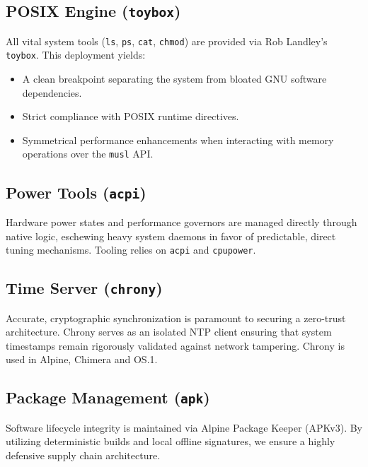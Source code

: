 \documentclass{article}
\begin{document}
\subsection{POSIX Engine (\texttt{toybox})}
All vital system tools (\texttt{ls}, \texttt{ps}, \texttt{cat}, \texttt{chmod}) are provided via Rob Landley’s \texttt{toybox}. This deployment yields:
\begin{itemize}
    \item A clean breakpoint separating the system from bloated GNU software dependencies.
    \item Strict compliance with POSIX runtime directives.
    \item Symmetrical performance enhancements when interacting with memory operations over the \texttt{musl} API.
\end{itemize}

\subsection{Power Tools (\texttt{acpi})}
Hardware power states and performance governors are managed directly through native logic, eschewing heavy system daemons in favor of predictable, direct tuning mechanisms. Tooling relies on \texttt{acpi} and \texttt{cpupower}.

\subsection{Time Server (\texttt{chrony})}
Accurate, cryptographic synchronization is paramount to securing a zero-trust architecture. Chrony serves as an isolated NTP client ensuring that system timestamps remain rigorously validated against network tampering. Chrony is used in Alpine, Chimera and OS.1.

\subsection{Package Management (\texttt{apk})}
Software lifecycle integrity is maintained via Alpine Package Keeper (APKv3). By utilizing deterministic builds and local offline signatures, we ensure a highly defensive supply chain architecture.

\begin{center}
\end{center}
\end{document}
